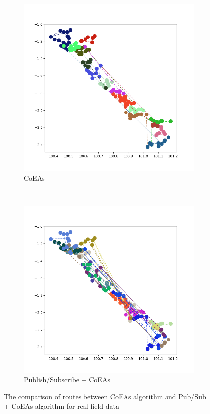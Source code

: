 \documentclass[conference]{IEEEtran}
\begin{document}
\begin{figure}[!]
	\centering
	\begin{subfigure}[t]{0.5\textwidth}
		\centering
		\includegraphics[width=\textwidth]{Resources/Images/test_result_normal_field_coes_paper}
		\caption{CoEAs}
		\label{fig:test_result_normal_field_coes_paper}
	\end{subfigure}%
	~ 
	\begin{subfigure}[t]{0.5\textwidth}
		\centering
		\includegraphics[width=\textwidth]{Resources/Images/test_result_normal_field_pubsub_coes_paper}
		\caption{Publish/Subscribe + CoEAs}
		\label{fig:test_result_normal_field_pubsub_coes_paper}
	\end{subfigure}
	\caption{The comparison of routes between CoEAs algorithm and Pub/Sub + CoEAs algorithm for real field data}
	\label{fig:test_result_normal_field_comparison}
\end{figure}
\end{document}
